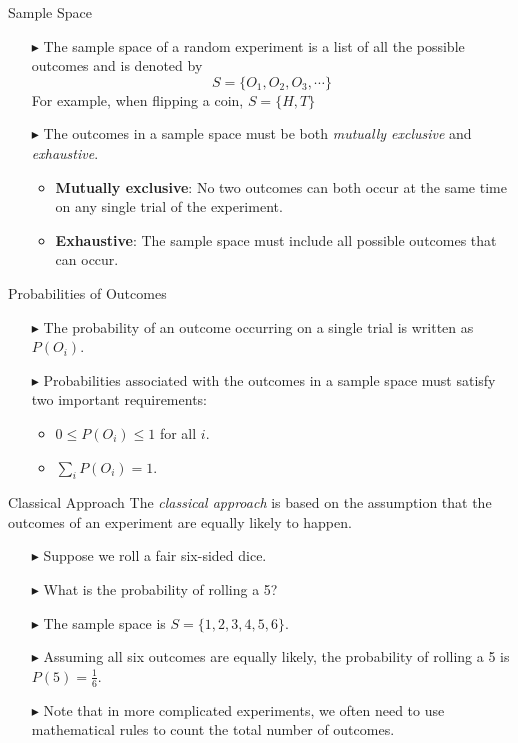 \documentclass[12pt]{beamer}
\begin{document}
\begin{frame}{Sample Space}
	\begin{itemize}
		\item[$\blacktriangleright$] The sample space of a random experiment is a list of all the possible outcomes and is denoted by
		$$S=\{O_1,O_2,O_3,\cdots\}$$
		For example, when flipping a coin, $S=\{H,T\}$
		\item[$\blacktriangleright$] The outcomes in a sample space must be both {\sl mutually exclusive} and {\sl exhaustive}.
		\begin{itemize}
			\item {\bf Mutually exclusive}: No two outcomes can both occur at the same time on any single trial of the experiment.
			\item {\bf Exhaustive}: The sample space must include all possible outcomes that can occur.
		\end{itemize}
	\end{itemize}
\end{frame}
\begin{frame}{Probabilities of Outcomes}
	\begin{itemize}
		\item[$\blacktriangleright$] The probability of an outcome occurring on a single trial is written as $P(O_i)$.
		\item[$\blacktriangleright$] Probabilities associated with the outcomes in a sample space must satisfy two important requirements:
		\begin{itemize}
			\item $0\le P(O_i)\le1$ for all $i$.
			\item $\sum_iP(O_i)=1$.
		\end{itemize}
	\end{itemize}
\end{frame}
\begin{frame}{Classical Approach}
	The {\sl classical approach} is based on the assumption that the outcomes of an experiment are equally likely to happen.
	\begin{itemize}
		\item[$\blacktriangleright$] Suppose we roll a {\color{red}fair} six-sided dice.
		\item[$\blacktriangleright$] What is the probability of rolling a 5?
		\item[$\blacktriangleright$] The sample space is $S=\{1,2,3,4,5,6\}$.
		\item[$\blacktriangleright$] Assuming all six outcomes are equally likely, the probability of rolling a 5 is $P(5)=\frac{1}{6}$.
		\item[$\blacktriangleright$] Note that in more complicated experiments, we often need to use mathematical rules to count the total number of outcomes.
	\end{itemize}
\end{frame}
\end{document}
